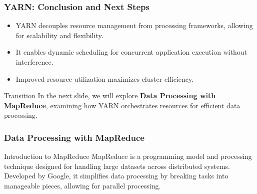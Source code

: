 \documentclass[aspectratio=169]{beamer}
\begin{document}
\begin{frame}[fragile]
    \frametitle{YARN: Conclusion and Next Steps}
    \begin{itemize}
        \item YARN decouples resource management from processing frameworks, allowing for scalability and flexibility.
        \item It enables dynamic scheduling for concurrent application execution without interference.
        \item Improved resource utilization maximizes cluster efficiency.
    \end{itemize}
    
    \begin{block}{Transition}
        In the next slide, we will explore \textbf{Data Processing with MapReduce}, examining how YARN orchestrates resources for efficient data processing.
    \end{block}
\end{frame}

\begin{frame}[fragile]
    \frametitle{Data Processing with MapReduce}
    \begin{block}{Introduction to MapReduce}
        MapReduce is a programming model and processing technique designed for handling large datasets across distributed systems. 
        Developed by Google, it simplifies data processing by breaking tasks into manageable pieces, allowing for parallel processing.
    \end{block}
\end{frame}
\end{document}
